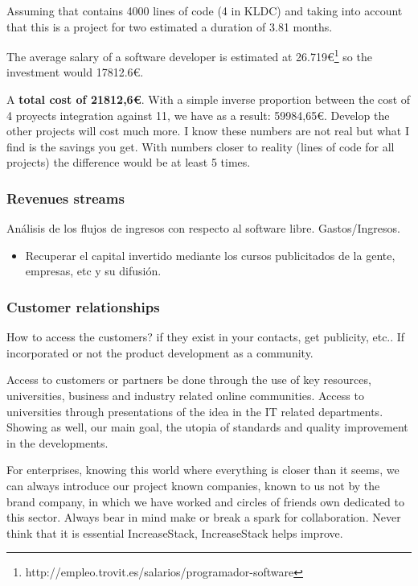 \documentclass[11pt]{scrartcl}
\begin{document}
\par Assuming that contains 4000 lines of code (4 in KLDC) and taking into account that this is a project for two estimated a duration of 3.81 months.
\par The average salary of a software developer is estimated at 26.719\euro\footnote{http://empleo.trovit.es/salarios/programador-software} so the investment would 17812.6\euro.
    
\par A \textbf{total cost of 21812,6\euro}. With a simple inverse proportion between the cost of 4 proyects integration against 11, we have as a result: 59984,65\euro. Develop the other projects will cost much more. I know these numbers are not real but what I find is the savings you get. With numbers closer to reality (lines of code for all projects) the difference would be at least 5 times.

    
\subsubsection{Revenues streams}


\par Análisis de los flujos de ingresos con respecto al software libre. Gastos/Ingresos.
    \begin{itemize}
        \item Recuperar el capital invertido mediante los cursos publicitados de la gente, empresas, etc y su difusión.
    \end{itemize}
    
    
\subsubsection{Customer relationships}

\par How to access the customers? if they exist in your contacts, get publicity, etc.. If incorporated or not the product development as a community.

\par Access to customers or partners be done through the use of key resources, universities, business and industry related online communities.
Access to universities through presentations of the idea in the IT related departments. Showing as well, our main goal, the utopia of standards and quality improvement in the developments.

\par For enterprises, knowing this world where everything is closer than it seems, we can always introduce our project known companies, known to us not by the brand company, in which we have worked and circles of friends own dedicated to this sector. Always bear in mind make or break a spark for collaboration. Never think that it is essential IncreaseStack, IncreaseStack helps improve.
\end{document}
